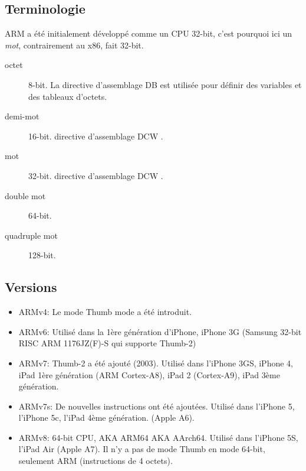 
\subsection{Terminologie}

ARM a été initialement développé comme un \ac{CPU} 32-bit, c'est pourquoi ici un
\emph{mot}, contrairement au x86, fait 32-bit.

\begin{description}
	\item[octet] 8-bit.
		La directive d'assemblage DB est utilisée pour définir des variables et des
		tableaux d'octets.
	\item[demi-mot] 16-bit. directive d'assemblage DCW \dittoclosing.
	\item[mot] 32-bit.  directive d'assemblage DCW \dittoclosing.
	\item[double mot] 64-bit.
	\item[quadruple mot] 128-bit.
\end{description}

\subsection{Versions}

\begin{itemize}
\item ARMv4: Le mode Thumb mode a été introduit.

\item ARMv6: Utilisé dans la 1ère génération d'iPhone, iPhone 3G (Samsung 32-bit RISC ARM 1176JZ(F)-S 
qui supporte Thumb-2)

\item ARMv7: Thumb-2 a été ajouté (2003).
Utilisé dans l'iPhone 3GS, iPhone 4, iPad 1ère génération (ARM Cortex-A8), iPad 2 (Cortex-A9),
iPad 3ème génération.

\item ARMv7s: De nouvelles instructions ont été ajoutées.
Utilisé dans l'iPhone 5, l'iPhone 5c, l'iPad 4ème génération. (Apple A6).

\item ARMv8: 64-bit CPU, \ac{AKA} ARM64 \ac{AKA} AArch64.
Utilisé dans l'iPhone 5S, l'iPad Air (Apple A7).
Il n'y a pas de mode Thumb en mode 64-bit, seulement ARM (instructions de 4 octets).
\end{itemize}



